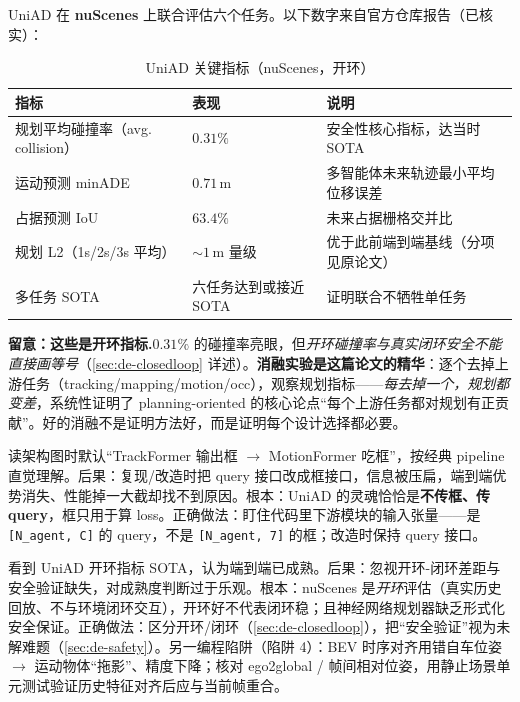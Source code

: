 UniAD 在 \textbf{nuScenes} 上联合评估六个任务。以下数字来自官方仓库报告（已核实）：

\begin{table}[H]\centering\small
\caption{UniAD 关键指标（nuScenes，开环）}
\label{tab:de-uniad-metrics}
\begin{tabular}{p{} p{} p{}}
\toprule
指标 & 表现 & 说明 \\
\midrule
规划平均碰撞率（avg. collision） & $\mathbf{0.31\%}$ & 安全性核心指标，达当时 SOTA \\
运动预测 minADE & $\mathbf{0.71}$\,m & 多智能体未来轨迹最小平均位移误差 \\
占据预测 IoU & $\mathbf{63.4\%}$ & 未来占据栅格交并比 \\
规划 L2（1s/2s/3s 平均） & $\sim 1$\,m 量级 & 优于此前端到端基线（分项见原论文） \\
多任务 SOTA & 六任务达到或接近 SOTA & 证明联合不牺牲单任务 \\
\bottomrule
\end{tabular}
\end{table}

\begin{note}
\textbf{留意：这些是开环指标.}\;$0.31\%$ 的碰撞率亮眼，但\emph{开环碰撞率与真实闭环安全不能直接画等号}（\cref{sec:de-closedloop} 详述）。\textbf{消融实验是这篇论文的精华}：逐个去掉上游任务（tracking/mapping/motion/occ），观察规划指标——\emph{每去掉一个，规划都变差}，系统性证明了 planning-oriented 的核心论点“每个上游任务都对规划有正贡献”。好的消融不是证明方法好，而是证明每个设计选择都必要。
\end{note}

\begin{pitfall}
读架构图时默认“TrackFormer 输出框 $\to$ MotionFormer 吃框”，按经典 pipeline 直觉理解。后果：复现/改造时把 query 接口改成框接口，信息被压扁，端到端优势消失、性能掉一大截却找不到原因。根本：UniAD 的灵魂恰恰是\textbf{不传框、传 query}，框只用于算 loss。正确做法：盯住代码里下游模块的输入张量——是 \texttt{[N\_agent, C]} 的 query，不是 \texttt{[N\_agent, 7]} 的框；改造时保持 query 接口。
\end{pitfall}

\begin{pitfall}
看到 UniAD 开环指标 SOTA，认为端到端已成熟。后果：忽视开环-闭环差距与安全验证缺失，对成熟度判断过于乐观。根本：nuScenes 是\emph{开环}评估（真实历史回放、不与环境闭环交互），开环好不代表闭环稳；且神经网络规划器缺乏形式化安全保证。正确做法：区分开环/闭环（\cref{sec:de-closedloop}），把“安全验证”视为未解难题（\cref{sec:de-safety}）。另一编程陷阱（陷阱 4）：BEV 时序对齐用错自车位姿 $\to$ 运动物体“拖影”、精度下降；核对 ego2global / 帧间相对位姿，用静止场景单元测试验证历史特征对齐后应与当前帧重合。
\end{pitfall}


